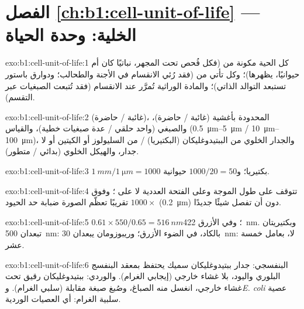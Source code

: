 \section*{الفصل \ref{ch:b1:cell-unit-of-life} --- الخلية: وحدة الحياة}

\begin{solution}{exo:b1:cell-unit-of-life:1}
كل  الحية مكونة من  (فكل  فُحص تحت المجهر، نباتيًا
كان أم حيوانيًا، يظهرها)؛ وكل  تأتي من  (فقد رُئي الانقسام
في الأجنة والطحالب؛ ودوارق باستور تستبعد التوالد الذاتي)؛ والمادة
الوراثية تُمرَّر عند الانقسام (فقد تُتبعت الصبغيات عبر التقسم).
\end{solution}

\begin{solution}{exo:b1:cell-unit-of-life:2}
 (غائبة / حاضرة)،  المحدودة بأغشية (غائبة / حاضرة)،
والصبغي (واحد حلقي / عدة صبغيات خطية)، والقياس
(\qtyrange{0.5}{5}{\micro m} / \qtyrange{10}{100}{\micro m})، والجدار
الخلوي من الببتيدوغليكان (البكتيريا) / من السليولوز أو الكيتين أو لا
جدار، والهيكل الخلوي (بدائي / متطور).
\end{solution}

\begin{solution}{exo:b1:cell-unit-of-life:3}
$\qty{1}{mm}/\qty{1}{\micro m} = 1000$ بكتيريا؛ و$1000/20 = 50$ 
حيوانية.
\end{solution}

\begin{solution}{exo:b1:cell-unit-of-life:4}
 تتوقف على طول الموجة وعلى الفتحة العددية لا على
؛ وفوق $1000\times$ تقريبًا تعظّم الصورة ضبابة حد الحيود
(\qty{0.2}{\micro m}) دون أن تفصل شيئًا جديدًا.
\end{solution}

\begin{solution}{exo:b1:cell-unit-of-life:5}
$0.61\times 550/0.65 = \qty{516}{nm}$؛ وفي الأزرق \qty{422}{nm}.
وبكتيريتان تبعدان \qty{500}{nm}: بالكاد، في الضوء الأزرق؛ وريبوزومان
يبعدان \qty{30}{nm}: لا، بعامل خمسة عشر.
\end{solution}

\begin{solution}{exo:b1:cell-unit-of-life:6}
البنفسجي: جدار ببتيدوغليكان سميك يحتفظ بمعقد البنفسج البلوري واليود،
بلا غشاء خارجي (إيجابي الغرام). والوردي: ببتيدوغليكان رقيق تحت غشاء
خارجي، انغسل منه الصباغ، وصُبغ صبغة مقابلة (سلبي الغرام).
و\emph{E. coli} عصية سلبية الغرام: أي العصيات الوردية.
\end{solution}

